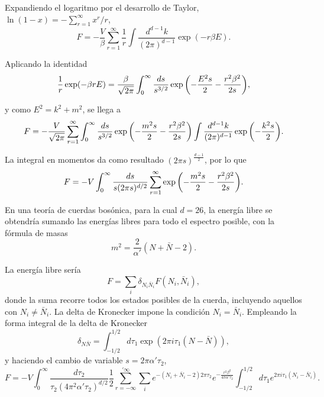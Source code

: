 Expandiendo el logaritmo por el desarrollo de Taylor, $\ln(1-x)=-\sum^\infty_{r=1} x^r/r$,
\begin{equation}
  F=-\frac{V}{\beta}\sum^\infty_{r=1} \frac 1 r\int \frac{d^{d-1}k}{(2\pi)^{d-1}}\exp(-r\beta E).
\end{equation}

Aplicando la identidad
\begin{equation}
  \frac 1 r \exp(-\beta r E)=\frac{\beta}{\sqrt{2\pi}}\int_0^\infty \frac{ds}{s^{3/2}}\exp\qty(-\frac{E^2s}{2}-\frac{r^2\beta^2}{2s}),
\end{equation}

y como $E^2=k^2+m^2$, se llega a 
\begin{equation}
  F=-\frac{V}{\sqrt{2\pi}}\sum^\infty_{r=1} \int_0^\infty \frac{ds}{s^{3/2}} \exp \qty(-\frac{m^2s}{2} -\frac{r^2\beta^2}{2s})
  \int \frac{d^{d-1}k}{(2\pi)^{d-1}}\exp\qty(-\frac{k^2s}{2}).
\end{equation}

La integral en momentos da como resultado $(2\pi s)^{\frac{d-1}{2}}$, por lo que
\begin{equation}
  F=-V \int_0^\infty \frac{ds}{s(2\pi s)^{d/2}}\sum^\infty_{r=1} \exp \qty(-\frac{m^2s}{2}- \frac{r^2\beta^2}{2s}).
\end{equation}

En una teoría de cuerdas bosónica, para la cual $d=26$, la energía libre se obtendría sumando las
energías libres para todo el espectro posible, con la fórmula de masas
\begin{equation}
  m^2=\frac{2}{\alpha'}(N+\bar N-2).
\end{equation}

La energía libre sería
\begin{equation}
  F=\sum_i \delta_{N_i \bar N_i} F(N_i,\bar N_i),
\end{equation}
donde la suma recorre todos los estados posibles de la cuerda, incluyendo aquellos con $N_i\neq \bar N_i$.
La delta de Kronecker impone la condición $N_i=\bar N_i$. 
Empleando la forma integral de la delta de Kronecker
\begin{equation}
   \delta_{N\bar N}=\int_{-1/2}^{1/2}d\tau_1 \exp(2\pi i\tau_1 (N-\bar N)),
\end{equation}
y haciendo el cambio de variable $s=2\pi\alpha'\tau_2$,
\begin{equation}
  F=-V \int_0^\infty \frac{d\tau_2}{\tau_2(4\pi^2\alpha'\tau_2)^{d/2}}\frac 1 2\sum_{r=-\infty}^{'\infty} 
  \sum_i e^{-(N_i+\bar N_i -2)2\pi\tau_2} e^{-\frac{r^2\beta^2}{4\pi\alpha'\tau_2}}\int_{-1/2}^{1/2} d\tau_1 e^{2\pi i\tau_1(N_i-\bar N_i)}.
\end{equation}

